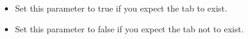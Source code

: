 
\begin{itemize}
\item Set this parameter to true if you expect the tab to exist. 
\item  Set this parameter to false if you expect the tab not to exist. 
\end{itemize}
